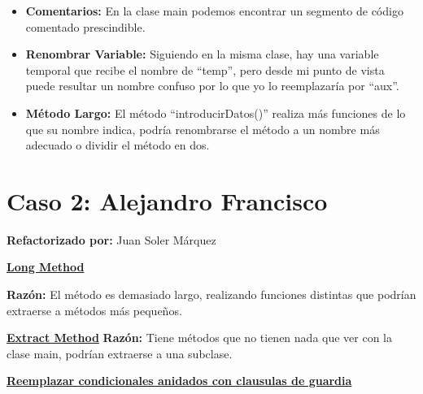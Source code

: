 \documentclass[11pt,a4paper,oneside]{book}
\begin{document}
\begin{itemize}
    \item \textbf{Comentarios: } En la clase main podemos encontrar un segmento de código comentado prescindible.
    
    
     \item \textbf{Renombrar Variable: } Siguiendo en la misma clase, hay una variable temporal que recibe el nombre de ``temp'', pero desde mi punto de vista puede resultar un nombre confuso por lo que yo lo reemplazaría por ``aux''.
     
     
      \item \textbf{Método Largo: } El método ``introducirDatos()'' realiza más funciones de lo que su nombre indica, podría renombrarse el método a un nombre más adecuado o dividir el método en dos.
          
  
\end{itemize}

\chapter{Caso 2: Alejandro Francisco}
\textbf{Refactorizado por:} Juan Soler Márquez \newline

    \hyperref[longmethod]{\textbf{Long Method}}
      \newline

     \textbf{Razón:} El método es demasiado largo, realizando funciones distintas que podrían extraerse a métodos más pequeños.
    \newline
       \newline

 \hyperref[extractmethod]{\textbf{Extract Method}}
\newline
  \textbf{Razón:} Tiene métodos que no tienen nada que ver con la clase main, podrían extraerse a una subclase.
  \newline

   
  
\newline

   \hyperref[replaceNestedConditionalWithGuardClauses]{\textbf{\textbf{Reemplazar condicionales anidados con clausulas de guardia}}}
   \newline
\end{document}
